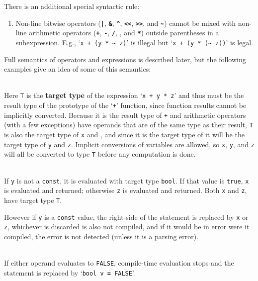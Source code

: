 \documentclass[12pt]{article}
\newcommand{\TT}[1]{{\tt \bfseries #1}}
\newcommand{\key}[1]{{\rm \bfseries #1}}
\newenvironment{indpar}[1][0.3in]%
	{\begin{list}{}%
		     {\setlength{\itemsep}{0in}%
		      \setlength{\topsep}{0in}%
		      \setlength{\parsep}{1ex}%
		      \setlength{\labelwidth}{#1}%
		      \setlength{\leftmargin}{#1}%
		      \addtolength{\leftmargin}{\labelsep}}%
	 \item}%
	{\end{list}}
\begin{document}
There is an additional special syntactic rule:
\begin{enumerate}
\item Non-line bitwise operators (\TT{|}, \TT{\&}, \TT{\textasciicircum},
\TT{<{}<}, \TT{>{}>}, and \TT{\textasciitilde}) cannot be mixed
with non-line arithmetic operators
(\TT{+}, \TT{-}, \TT{/}, \TT{*}, and \TT{**})
outside parentheses in a subexpression.
E.g., `{\tt x + (y * \textasciitilde{} z)}'
is illegal but `{\tt x + (y * (\textasciitilde{} z))}' is legal.
\end{enumerate}


Full semantics of operators and expressions is described later,
but the following examples give an idea of some of this semantics:

\begin{indpar}
\hspace*{-0.2in}{\tt T v \TT{=} x + y * z} \\
       Here {\tt T} is the \key{target type} of the expression
       `{\tt x + y * z}' and thus must be the result type of the prototype
       of the `{\tt +}' function, since function results cannot be
       implicitly converted.  Because it is the result type of {\tt +} and
       arithmetic operators (with a few exceptions)
       have operands that are of the same
       type as their result,
       {\tt T} is also the target type of {\tt x} and {\tt *}, and since it is
       the target type of {\tt *} it will be the target type of {\tt y}
       and {\tt z}.  Implicit conversions of variables are allowed,
       so {\tt x}, {\tt y}, and {\tt z} will all be converted
       to type {\tt T} before any computation is done.

\hspace*{-0.2in}{\tt T v \TT{=} x \TT{if} y \TT{else} z} \\
      If {\tt y} is not a {\tt const}, it is evaluated with
      target type {\tt bool}.  If that value
      is {\tt true}, {\tt x} is evaluated and returned; otherwise
      {\tt z} is evaluated and returned.  Both {\tt x} and {\tt z},
      have target type {\tt T}.

      However if {\tt y} is a {\tt const} value, the right-side of
      the statement is replaced by {\tt x} or {\tt z}, whichever
      is discarded is also not compiled, and if it would be in error
      were it compiled, the error is not detected (unless it is a parsing
      error).

\hspace*{-0.2in}{\tt bool v = x \TT{AND} y} \\
      If either operand evaluates to {\tt FALSE},
      compile-time evaluation stops and the statement is replaced by
      `{\tt bool v \TT{=} FALSE}'.


\end{indpar}
\end{document}
